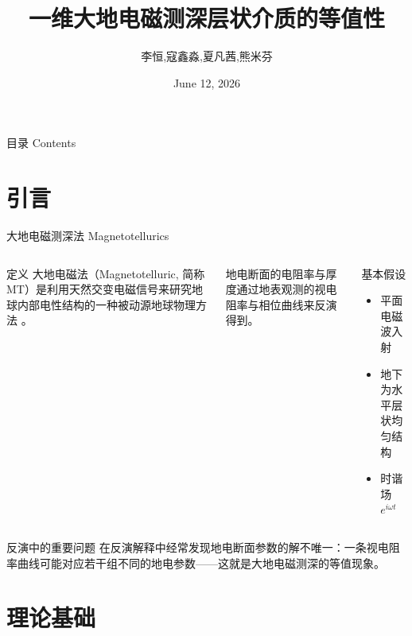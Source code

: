 \documentclass[10pt,aspectratio=169,fontset=none]{ctexbeamer}
\title{一维大地电磁测深层状介质的等值性}
\author{李恒,寇鑫淼,夏凡茜,熊米芬}
\institute{地球科学与信息物理学院}
\date{June 12, 2026}
\begin{document}
    \begin{frame}
        \titlepage
    \end{frame}

    \begin{frame}{目录 Contents}
        \tableofcontents
    \end{frame}

    \section{引言}

    \begin{frame}{大地电磁测深法 Magnetotellurics}
        \begin{columns}
            \begin{tblock}{定义}
                大地电磁法（Magnetotelluric, 简称 MT）是利用天然交变电磁信号来研究地球内部电性结构的一种被动源地球物理方法 。
            \end{tblock}
            \vspace{0.3em}
            地电断面的电阻率与厚度通过地表观测的视电阻率与相位曲线来反演得到。

            \begin{block}{基本假设}
                \begin{itemize}
                    \item 平面电磁波入射
                    \item 地下为水平层状均匀结构
                    \item 时谐场 $e^{i\omega t}$
                \end{itemize}
            \end{block}
        \end{columns}
        \vspace{0.4em}
        \begin{talert}{反演中的重要问题}
            在反演解释中经常发现地电断面参数的解不唯一：一条视电阻率曲线可能对应若干组不同的地电参数——这就是大地电磁测深的\alert{等值现象}。
        \end{talert}
    \end{frame}

    \section{理论基础}
\end{document}
